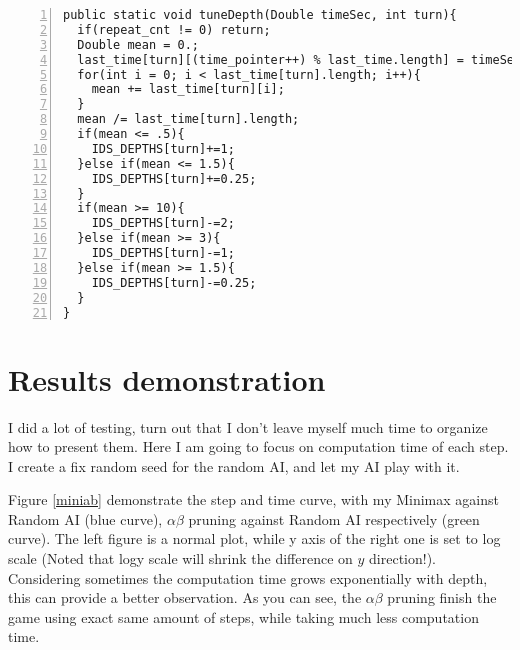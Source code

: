 \documentclass{article}
\begin{document}
\begin{lstlisting}[numbers=left]
public static void tuneDepth(Double timeSec, int turn){
  if(repeat_cnt != 0) return;
  Double mean = 0.;
  last_time[turn][(time_pointer++) % last_time.length] = timeSec;
  for(int i = 0; i < last_time[turn].length; i++){
    mean += last_time[turn][i];
  }
  mean /= last_time[turn].length;
  if(mean <= .5){
    IDS_DEPTHS[turn]+=1;
  }else if(mean <= 1.5){
    IDS_DEPTHS[turn]+=0.25;
  }
  if(mean >= 10){
    IDS_DEPTHS[turn]-=2;
  }else if(mean >= 3){
    IDS_DEPTHS[turn]-=1;
  }else if(mean >= 1.5){
    IDS_DEPTHS[turn]-=0.25;
  }
}
\end{lstlisting}



\clearpage
\section{Results demonstration}


I did a lot of testing, turn out that I don't leave myself much time to organize how to present them. Here I am going to focus on computation time of each step. I create a fix random seed for the random AI, and let my AI play with it. 

Figure \ref{miniab} demonstrate the step and time curve, with my Minimax against Random AI (blue curve),  $\alpha\beta$ pruning against Random AI respectively (green curve). The left figure is a normal plot, while y axis of the right one is set to log scale (Noted that logy scale will shrink the difference on $y$ direction!). Considering sometimes the computation time grows exponentially with depth, this can provide a better observation. As you can see, the $\alpha\beta$ pruning finish the game using exact same amount of steps, while taking much less computation time.

\begin{figure*}[!h]
\normalsize
\centering
{}
\caption{step and time curve of Random MinimaxAI and $\alpha\beta$ pruning.}
\label{miniab} %
\end{figure*}
\end{document}
